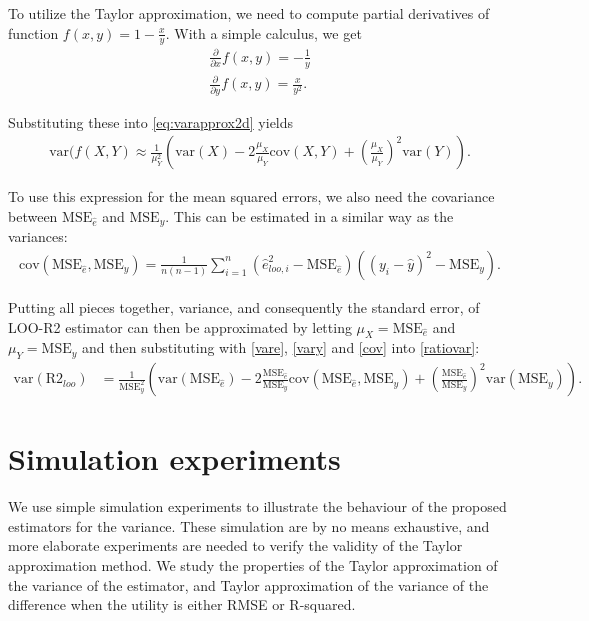 \documentclass{article}
\begin{document}
To utilize the Taylor approximation, we need to compute partial derivatives of function $f(x,y) = 1 - \frac{x}{y}$. With a simple calculus, we get
\begin{align}
    \frac{\partial}{\partial x}f(x,y) = -\frac{1}{y} \\
    \frac{\partial}{\partial y}f(x,y) = \frac{x}{y^2}.
\end{align}

Substituting these into \eqref{eq:varapprox2d} yields
\begin{align}
    \text{var}(f(X, Y) \approx \frac{1}{\mu_Y^2} \left( \text{var}(X) - 2 \frac{\mu_X}{\mu_Y} \text{cov}(X,Y) + \left( \frac{\mu_X}{\mu_Y} \right)^2 \text{var}(Y) \right) \label{ratiovar}.
\end{align}

 To use this expression for the mean squared errors, we also need the covariance between $\text{MSE}_{\hat{e}}$ and $\text{MSE}_y$. This can be estimated in a similar way as the variances:
 \begin{align}
     \text{cov}(\text{MSE}_{\hat{e}}, \text{MSE}_{y} ) = \frac{1}{n (n -1 )} \sum_{i = 1}^n \left( \hat{e}_{loo, i}^2 - \text{MSE}_{\hat{e}} \right) \left( (y_i - \hat{y})^2 -\text{MSE}_y \right) \label{cov}.
 \end{align}
 
 Putting all pieces together, variance, and consequently the standard error, of LOO-R2 estimator can then be approximated by letting $\mu_X = \text{MSE}_{\hat{e}}$ and $\mu_Y = \text{MSE}_y$ and then substituting with \eqref{vare}, \eqref{vary} and \eqref{cov} into \eqref{ratiovar}:
 \begin{align}
     \text{var}(\text{R2}_{loo}) &= \frac{1}{\text{MSE}_y^2} \left( \text{var}(\text{MSE}_{\hat{e}}) - 2 \frac{\text{MSE}_{\hat{e}}}{\text{MSE}_y} \text{cov}(\text{MSE}_{\hat{e}}, \text{MSE}_{y} ) +  \left( \frac{\text{MSE}_{\hat{e}}}{\text{MSE}_y} \right)^2 \text{var}(\text{MSE}_y) \right) \label{eq:loor2-se}.
 \end{align}
 
\section{Simulation experiments}
We use simple simulation experiments to illustrate the behaviour of the proposed estimators for the variance. These simulation are by no means exhaustive, and more elaborate experiments are needed to verify the validity of the Taylor approximation method. We study the properties of the Taylor approximation of the variance of the estimator, and Taylor approximation of the variance of the difference when the utility is either RMSE or R-squared.
\end{document}
